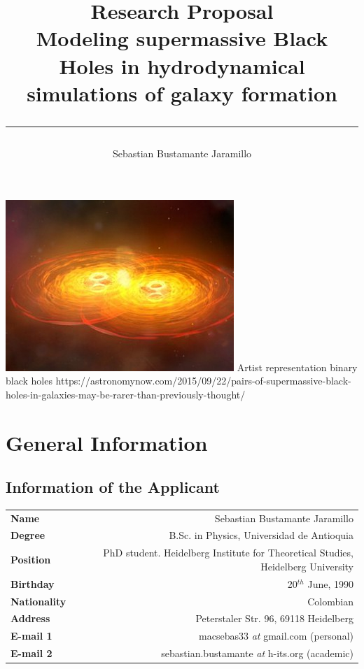 \documentclass[a4,useAMS,usenatbib,usegraphicx,12pt]{article}
\title{{\textbf{Research Proposal}}\\ 
				Modeling supermassive Black Holes in hydrodynamical simulations of
				galaxy formation\\ 
				\color{black}\rule{15cm}{0.5mm}}
\author{Sebastian Bustamante Jaramillo}
\date{}
\begin{document}
\maketitle
\begin{center}
\includegraphics[trim = 0mm 2.0cm 0mm 2.0cm, clip, keepaspectratio=true,
width=0.7\textheight]{Presentation1.png}
\tiny{Artist representation binary black holes https://astronomynow.com/2015/09/22/pairs-of-supermassive-black-holes-in-galaxies-may-be-rarer-than-previously-thought/}
\end{center}
\tableofcontents
 
\newpage 

\section{General Information}
\small
\subsection*{Information of the Applicant}
\begin{tabular}{L!{\VRule}R}
\bf Name		& Sebastian Bustamante Jaramillo\\
\bf Degree		& B.Sc. in Physics, Universidad de Antioquia\\
\bf Position	& PhD student. Heidelberg Institute for Theoretical Studies, Heidelberg University\\
\bf Birthday	& { 20$^{th}$ June, 1990}\\
\bf Nationality & Colombian\\
\bf Address	& Peterstaler Str. 96, 69118 Heidelberg\\
\bf E-mail 1	& macsebas33 \textit{at} gmail.com (personal)\\
\bf E-mail 2	& sebastian.bustamante \textit{at} h-its.org (academic)\\
\end{tabular}
\end{document}
